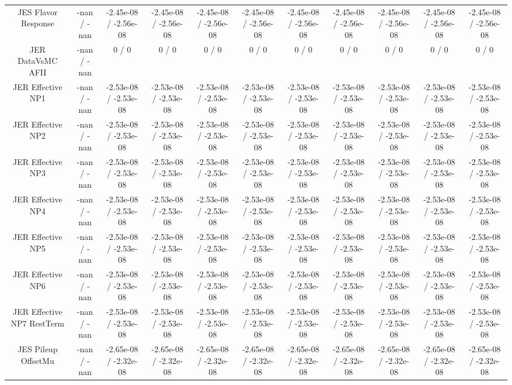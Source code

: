 \begin{table}[htbp]
\begin{center}
\begin{tabular}{|c|c|c|c|c|c|c|c|c|c|c|}
  JES Flavor Response & -nan / -nan & -2.45e-08 / -2.56e-08 & -2.45e-08 / -2.56e-08 & -2.45e-08 / -2.56e-08 & -2.45e-08 / -2.56e-08 & -2.45e-08 / -2.56e-08 & -2.45e-08 / -2.56e-08 & -2.45e-08 / -2.56e-08 & -2.45e-08 / -2.56e-08 & -2.45e-08 / -2.56e-08 \\ 
  JER DataVsMC AFII & -nan / -nan & 0 / 0 & 0 / 0 & 0 / 0 & 0 / 0 & 0 / 0 & 0 / 0 & 0 / 0 & 0 / 0 & 0 / 0 \\ 
  JER Effective NP1 & -nan / -nan & -2.53e-08 / -2.53e-08 & -2.53e-08 / -2.53e-08 & -2.53e-08 / -2.53e-08 & -2.53e-08 / -2.53e-08 & -2.53e-08 / -2.53e-08 & -2.53e-08 / -2.53e-08 & -2.53e-08 / -2.53e-08 & -2.53e-08 / -2.53e-08 & -2.53e-08 / -2.53e-08 \\ 
  JER Effective NP2 & -nan / -nan & -2.53e-08 / -2.53e-08 & -2.53e-08 / -2.53e-08 & -2.53e-08 / -2.53e-08 & -2.53e-08 / -2.53e-08 & -2.53e-08 / -2.53e-08 & -2.53e-08 / -2.53e-08 & -2.53e-08 / -2.53e-08 & -2.53e-08 / -2.53e-08 & -2.53e-08 / -2.53e-08 \\ 
  JER Effective NP3 & -nan / -nan & -2.53e-08 / -2.53e-08 & -2.53e-08 / -2.53e-08 & -2.53e-08 / -2.53e-08 & -2.53e-08 / -2.53e-08 & -2.53e-08 / -2.53e-08 & -2.53e-08 / -2.53e-08 & -2.53e-08 / -2.53e-08 & -2.53e-08 / -2.53e-08 & -2.53e-08 / -2.53e-08 \\ 
  JER Effective NP4 & -nan / -nan & -2.53e-08 / -2.53e-08 & -2.53e-08 / -2.53e-08 & -2.53e-08 / -2.53e-08 & -2.53e-08 / -2.53e-08 & -2.53e-08 / -2.53e-08 & -2.53e-08 / -2.53e-08 & -2.53e-08 / -2.53e-08 & -2.53e-08 / -2.53e-08 & -2.53e-08 / -2.53e-08 \\ 
  JER Effective NP5 & -nan / -nan & -2.53e-08 / -2.53e-08 & -2.53e-08 / -2.53e-08 & -2.53e-08 / -2.53e-08 & -2.53e-08 / -2.53e-08 & -2.53e-08 / -2.53e-08 & -2.53e-08 / -2.53e-08 & -2.53e-08 / -2.53e-08 & -2.53e-08 / -2.53e-08 & -2.53e-08 / -2.53e-08 \\ 
  JER Effective NP6 & -nan / -nan & -2.53e-08 / -2.53e-08 & -2.53e-08 / -2.53e-08 & -2.53e-08 / -2.53e-08 & -2.53e-08 / -2.53e-08 & -2.53e-08 / -2.53e-08 & -2.53e-08 / -2.53e-08 & -2.53e-08 / -2.53e-08 & -2.53e-08 / -2.53e-08 & -2.53e-08 / -2.53e-08 \\ 
  JER Effective NP7 RestTerm & -nan / -nan & -2.53e-08 / -2.53e-08 & -2.53e-08 / -2.53e-08 & -2.53e-08 / -2.53e-08 & -2.53e-08 / -2.53e-08 & -2.53e-08 / -2.53e-08 & -2.53e-08 / -2.53e-08 & -2.53e-08 / -2.53e-08 & -2.53e-08 / -2.53e-08 & -2.53e-08 / -2.53e-08 \\ 
  JES Pileup OffsetMu & -nan / -nan & -2.65e-08 / -2.32e-08 & -2.65e-08 / -2.32e-08 & -2.65e-08 / -2.32e-08 & -2.65e-08 / -2.32e-08 & -2.65e-08 / -2.32e-08 & -2.65e-08 / -2.32e-08 & -2.65e-08 / -2.32e-08 & -2.65e-08 / -2.32e-08 & -2.65e-08 / -2.32e-08 \\ 

\end{tabular}
\end{center}
\end{table}
